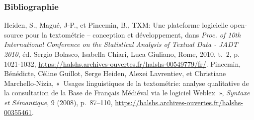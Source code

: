 \documentclass{beamer}
\begin{document}
\begin{frame}[fragile]
\frametitle{Bibliographie} 

\begin{thebibliography}{Heiden et al., 2010}
	 Heiden, S., Magué, J-P., et Pincemin, B., \og{}TXM: Une plateforme logicielle open-source pour la textométrie – conception et développement\fg{}, dans \textit{Proc. of 10th International Conference on the Statistical Analysis of Textual Data - JADT 2010}, éd. Sergio Bolasco, Isabella Chiari, Luca Giuliano, Rome, 2010, t.~2, p. 1021-1032, \url{https://halshs.archives-ouvertes.fr/halshs-00549779/fr/}.
	 Pincemin, Bénédicte, Céline Guillot, Serge Heiden, Alexei Lavrentiev, et Christiane Marchello-Nizia, « Usages linguistiques de la textométrie: analyse qualitative de la consultation de la Base de Français Médiéval via le logiciel Weblex », \textit{Syntaxe et Sémantique}, 9 (2008), p.~87–110, \url{https://halshs.archives-ouvertes.fr/halshs-00355461}.
	
	
	
\end{thebibliography}


\end{frame}
\end{document}
